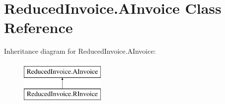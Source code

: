 \hypertarget{class_reduced_invoice_1_1_a_invoice}{}\section{Reduced\+Invoice.\+A\+Invoice Class Reference}
\label{class_reduced_invoice_1_1_a_invoice}
Inheritance diagram for Reduced\+Invoice.\+A\+Invoice\+:\begin{figure}[H]
\begin{center}
\leavevmode
\includegraphics[height=2.000000cm]{class_reduced_invoice_1_1_a_invoice}
\end{center}
\end{figure}
